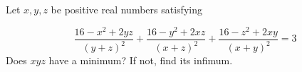 Let $x, y, z$ be positive real numbers satisfying

\[\dfrac{16 - x^2 + 2yz}{(y + z)^2} +\dfrac{16 - y^2 + 2xz}{(x + z)^2} +\dfrac{16 - z^2 + 2xy}{(x + y)^2} = 3\]Does $xyz$ have a minimum? If not, find its infimum.
